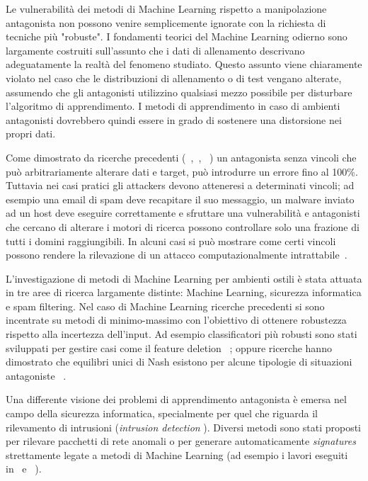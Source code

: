 Le vulnerabilità dei metodi di Machine Learning rispetto a manipolazione antagonista non possono venire semplicemente ignorate con la richiesta di tecniche più "robuste". I fondamenti teorici del Machine Learning odierno sono largamente costruiti sull'assunto che i dati di allenamento descrivano adeguatamente la realtà del fenomeno studiato. Questo assunto viene chiaramente violato nel caso che le distribuzioni di allenamento o di test vengano alterate, assumendo che gli antagonisti utilizzino qualsiasi mezzo possibile per disturbare l'algoritmo di apprendimento. I metodi di apprendimento in caso di ambienti antagonisti dovrebbero quindi essere in grado di sostenere una distorsione nei propri dati.

Come dimostrato da ricerche precedenti (~\cite{kearnsli},~\cite{Auer2002},~\cite{paclearning} ) un antagonista senza vincoli che può arbitrariamente alterare dati e target, può introdurre un errore fino al 100\%. Tuttavia nei casi pratici gli attackers devono atteneresi a determinati vincoli; ad esempio una email di spam deve recapitare il suo messaggio, un malware inviato ad un host deve eseguire correttamente e sfruttare una vulnerabilità e antagonisti che cercano di alterare i motori di ricerca possono controllare solo una frazione di tutti i domini raggiungibili. In alcuni casi si può mostrare come certi vincoli possono rendere la rilevazione di un attacco computazionalmente intrattabile~\cite{fogla}.

L'investigazione di metodi di Machine Learning per ambienti ostili è stata attuata in tre aree di ricerca largamente distinte: Machine Learning, sicurezza informatica e spam filtering. Nel caso di Machine Learning ricerche precedenti si sono incentrate su metodi di minimo-massimo con l'obiettivo di ottenere robustezza rispetto alla incertezza dell'input. Ad esempio classificatori più robusti sono stati sviluppati per gestire casi come il feature deletion~\cite{globerson} ; oppure ricerche hanno dimostrato che equilibri unici di Nash esistono per alcune tipologie di situazioni antagoniste~\cite{nash} .

Una differente visione dei problemi di apprendimento antagonista è emersa nel campo della sicurezza informatica, specialmente per quel che riguarda il rilevamento di intrusioni (\textit{intrusion detection} ). Diversi metodi sono stati proposti per rilevare pacchetti di rete anomali o per generare automaticamente \textit{signatures} strettamente legate a metodi di Machine Learning (ad esempio i lavori eseguiti in~\cite{wangstolfo} e~\cite{wang2006} ).

